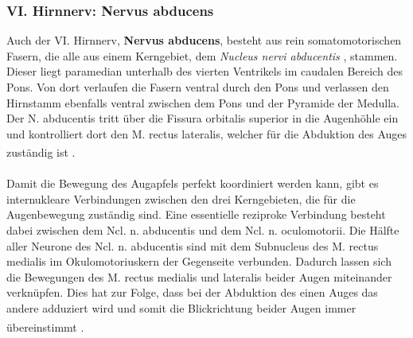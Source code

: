 \documentclass[12pt,a4paper,pdftex]{article}
\begin{document}
\subsubsection*{VI. Hirnnerv: Nervus abducens} 
Auch der VI. Hirnnerv, \textbf{Nervus abducens}, besteht aus rein somatomotorischen Fasern, die alle aus einem Kerngebiet, dem \textit{Nucleus nervi abducentis} , stammen. Dieser liegt paramedian unterhalb des vierten Ventrikels im caudalen Bereich des Pons. Von dort verlaufen die Fasern ventral durch den Pons und verlassen den Hirnstamm ebenfalls ventral zwischen dem Pons und der Pyramide der Medulla. Der N. abducentis tritt über die Fissura orbitalis superior in die Augenhöhle ein und kontrolliert dort den M. rectus lateralis, welcher für die Abduktion des Auges zuständig ist \textsuperscript{\cite[10]{crossman2014neuroanatomy}}. \\    
\\ \noindent Damit die Bewegung des Augapfels perfekt koordiniert werden kann, gibt es internukleare Verbindungen zwischen den drei Kerngebieten, die für die Augenbewegung zuständig sind.    
Eine essentielle reziproke Verbindung besteht dabei zwischen dem Ncl. n. abducentis und dem Ncl. n. oculomotorii. Die Hälfte aller Neurone des Ncl. n. abducentis sind mit dem Subnucleus des M. rectus medialis im Okulomotoriuskern der Gegenseite verbunden. Dadurch lassen sich die Bewegungen des M. rectus medialis und lateralis beider Augen miteinander verknüpfen. Dies hat zur Folge, dass bei der Abduktion des einen Auges das andere adduziert wird und somit die Blickrichtung beider Augen immer übereinstimmt \textsuperscript{\cite[6]{trepel2011neuroanatomie}}. 
\end{document}
